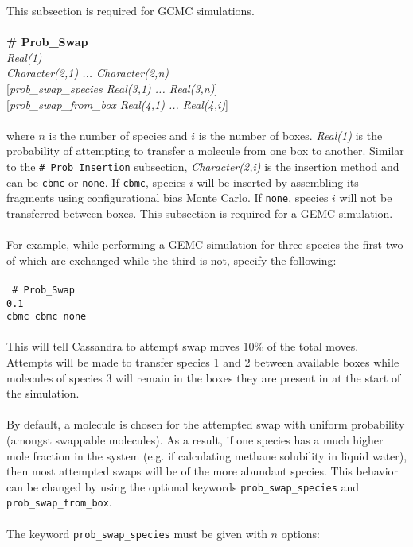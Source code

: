 This subsection is required for GCMC simulations. \\ \\
%
%
%
{\bf \# Prob\_Swap}\\
{\it Real(1)} \\ 
{\it Character(2,1) ... Character(2,n)} \\
{[}{\it prob\_swap\_species Real(3,1) ... Real(3,n)}] \\
{[}{\it prob\_swap\_from\_box Real(4,1) ... Real(4,i)}] \\ \\
%
where $n$ is the number of species and $i$ is the number of boxes.
{\em Real(1)} is the probability of attempting to transfer a molecule from one box to another. 
Similar to the \texttt{\# Prob\_Insertion} subsection, 
{\em Character(2,i)} is the insertion method and can be \texttt{cbmc} or \texttt{none}. 
If \texttt{cbmc}, species $i$ will be inserted by assembling its 
fragments using configurational bias Monte Carlo.
If \texttt{none}, species $i$ will not be transferred between boxes.
This subsection is required for a GEMC simulation. \\ \\
%
For example, while performing a GEMC simulation for three species the first two of which are exchanged
while the third is not, specify the following: \\ \\
%
\texttt{ \# Prob\_Swap\\
0.1 \\ 
cbmc cbmc none \\ \\
}
%
This will tell Cassandra to attempt swap moves 10\% of the total moves. 
Attempts will be made to transfer species 1 and 2 between available boxes while molecules 
of species 3 will remain in the boxes they are present in at the start of the simulation. \\ \\
%
By default, a molecule is chosen for the attempted swap with uniform probability 
(amongst swappable molecules).
As a result, if one species has a much higher mole fraction in the system 
(e.g. if calculating methane solubility in liquid water),
then most attempted swaps will be of the more abundant species.
This behavior can be changed by using the optional keywords 
{\tt prob\_swap\_species} and {\tt prob\_swap\_from\_box}. \\ \\
%
The keyword \texttt{prob\_swap\_species} must be given with $n$ options: 

